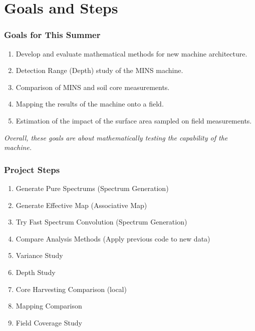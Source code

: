 \documentclass[notheorems,11pt,compress]{beamer}
\begin{document}
\section{Goals and Steps}

\begin{frame}
\frametitle{Goals for This Summer}
\begin{enumerate}
    \item Develop and evaluate mathematical methods for new machine architecture.
    \item Detection Range (Depth) study of the MINS machine.
    \item Comparison of MINS and soil core measurements.
    \item Mapping the results of the machine onto a field.
    \item Estimation of the impact of the surface area sampled on field measurements.
\end{enumerate}
\small
\textit{Overall, these goals are about mathematically testing the capability of the machine.}
\end{frame}

\begin{frame}
\frametitle{Project Steps}
\begin{enumerate}
    \item Generate Pure Spectrums (Spectrum Generation)
    \item Generate Effective Map (Associative Map)
    \item Try Fast Spectrum Convolution (Spectrum Generation)
    \item Compare Analysis Methods (Apply previous code to new data)
    \item Variance Study
    \item Depth Study
    \item Core Harvesting Comparison (local)
    \item Mapping Comparison
    \item Field Coverage Study
\end{enumerate}
\end{frame}
\end{document}
